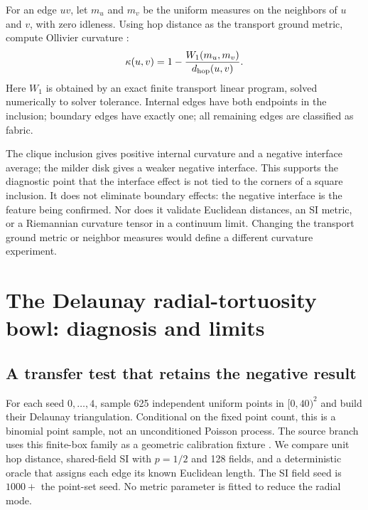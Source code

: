 \documentclass[11pt,letterpaper]{article}
\theoremstyle{definition}
\theoremstyle{remark}
\begin{document}
For an edge $uv$, let $m_u$ and $m_v$ be the uniform measures on the neighbors of $u$ and $v$, with zero idleness. Using hop distance as the transport ground metric, compute Ollivier curvature \cite{ollivier2009}:
\begin{equation}
 \kappa(u,v)=1-\frac{W_1(m_u,m_v)}{d_{\rm hop}(u,v)}.
 \label{eq:curvature}
\end{equation}
Here $W_1$ is obtained by an exact finite transport linear program, solved numerically to solver tolerance. Internal edges have both endpoints in the inclusion; boundary edges have exactly one; all remaining edges are classified as fabric.

\begin{table}[htbp]
\centering\small

\caption{New disk-interface curvature measurements. Fifteen edges per class are sampled with Python's seed-zero generator; the exact sampled edges and individual curvatures are saved. This sampling differs from the historical NumPy-seeded fixture. Zero fabric means concern the sampled edges, not every outer-boundary edge of the grid.}
\label{tab:disk}
\end{table}

The clique inclusion gives positive internal curvature and a negative interface average; the milder disk gives a weaker negative interface. This supports the diagnostic point that the interface effect is not tied to the corners of a square inclusion. It does not eliminate boundary effects: the negative interface is the feature being confirmed. Nor does it validate Euclidean distances, an SI metric, or a Riemannian curvature tensor in a continuum limit. Changing the transport ground metric or neighbor measures would define a different curvature experiment.

\section{The Delaunay radial-tortuosity bowl: diagnosis and limits}\label{sec:delaunay}
\subsection{A transfer test that retains the negative result}
For each seed $0,\ldots,4$, sample 625 independent uniform points in $[0,40)^2$ and build their Delaunay triangulation. Conditional on the fixed point count, this is a binomial point sample, not an unconditioned Poisson process. The source branch uses this finite-box family as a geometric calibration fixture \cite{leblondGraphs}. We compare unit hop distance, shared-field SI with $p=1/2$ and 128 fields, and a deterministic oracle that assigns each edge its known Euclidean length. The SI field seed is $1000+$ the point-set seed. No metric parameter is fitted to reduce the radial mode.
\end{document}
